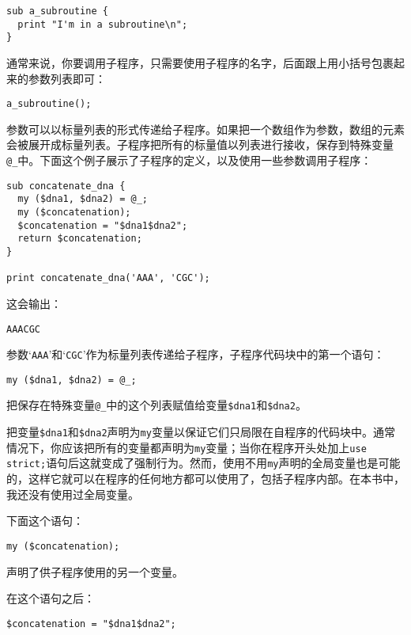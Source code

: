 \begin{lstlisting}
sub a_subroutine {
  print "I'm in a subroutine\n";
}
\end{lstlisting}

通常来说，你要调用子程序，只需要使用子程序的名字，后面跟上用小括号包裹起来的参数列表即可：

\begin{lstlisting}
a_subroutine();
\end{lstlisting}

参数可以以标量列表的形式传递给子程序。如果把一个数组作为参数，数组的元素会被展开成标量列表。子程序把所有的标量值以列表进行接收，保存到特殊变量\verb|@_|中。下面这个例子展示了子程序的定义，以及使用一些参数调用子程序：

\begin{lstlisting}
sub concatenate_dna {
  my ($dna1, $dna2) = @_;
  my ($concatenation);
  $concatenation = "$dna1$dna2";
  return $concatenation;
}

print concatenate_dna('AAA', 'CGC');
\end{lstlisting}

这会输出：

\begin{lstlisting}
AAACGC
\end{lstlisting}

参数`\verb|AAA|'和`\verb|CGC|'作为标量列表传递给子程序，子程序代码块中的第一个语句：

\begin{lstlisting}
my ($dna1, $dna2) = @_;
\end{lstlisting}

把保存在特殊变量\verb|@_|中的这个列表赋值给变量\verb|$dna1|和\verb|$dna2|。

把变量\verb|$dna1|和\verb|$dna2|声明为\verb|my|变量以保证它们只局限在自程序的代码块中。通常情况下，你应该把所有的变量都声明为\verb|my|变量；当你在程序开头处加上\verb|use strict;|语句后这就变成了强制行为。然而，使用不用\verb|my|声明的全局变量也是可能的，这样它就可以在程序的任何地方都可以使用了，包括子程序内部。在本书中，我还没有使用过全局变量。

下面这个语句：

\begin{lstlisting}
my ($concatenation);
\end{lstlisting}

声明了供子程序使用的另一个变量。

在这个语句之后：

\begin{lstlisting}
$concatenation = "$dna1$dna2"; 
\end{lstlisting}

